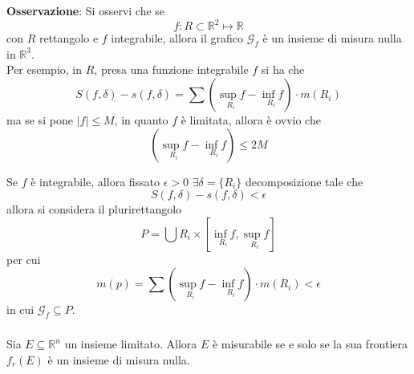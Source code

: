 \documentclass[a4paper]{extarticle}
\begin{document}
\vspace{2em}
\noindent
\textbf{Osservazione}: Si osservi che se
\[f : R \subset \mathbb{R}^2 \longmapsto \mathbb{R}\]
con $R$ rettangolo e $f$ integrabile, allora il grafico $\mathcal{G}_f$ è un insieme di misura nulla in $\mathbb{R}^3$.\\
Per esempio, in $R$, presa una funzione integrabile $f$ si ha che
\[S(f,\delta) - s(f,\delta) = \sum \left(\underset{R_i}{\sup f} - \underset{R_i}{\inf f}\right) \cdot m(R_i)\]
ma se si pone $\vert f \vert \leq M$, in quanto $f$ è limitata, allora è ovvio che
\[\left(\underset{R_i}{\sup f} - \underset{R_i}{\inf f}\right) \leq 2M\]

\vspace{1em}
\noindent
Se $f$ è integrabile, allora fissato $\epsilon > 0$ $\exists \delta = \{R_i\}$ decomposizione tale che
\[S(f,\delta)-s(f,\delta) < \epsilon\]
allora si considera il plurirettangolo
\[P=\bigcup R_i \times \left[\underset{R_i}{\inf f}, \underset{R_i}{\sup f}\right]\]
per cui
\[m(p) = \sum \left(\underset{R_i}{\sup f} - \underset{R_i}{\inf f}\right) \cdot m(R_i) < \epsilon\]
in cui $\mathcal{G}_f \subseteq P$.

\vspace{1em}
\noindent
\subsubsection{}
Sia $E \subseteq \mathbb{R}^n$ un insieme limitato. Allora $E$ è misurabile se e solo se la sua frontiera $f_r(E)$ è un insieme di misura nulla.
\end{document}
